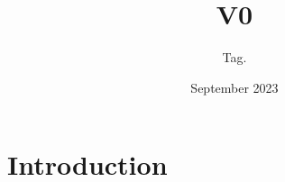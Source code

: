 \documentclass{article}
\title{V0}
\author{Tag. }
\date{September 2023}
\begin{document}
\maketitle

\section{Introduction}
\end{document}
